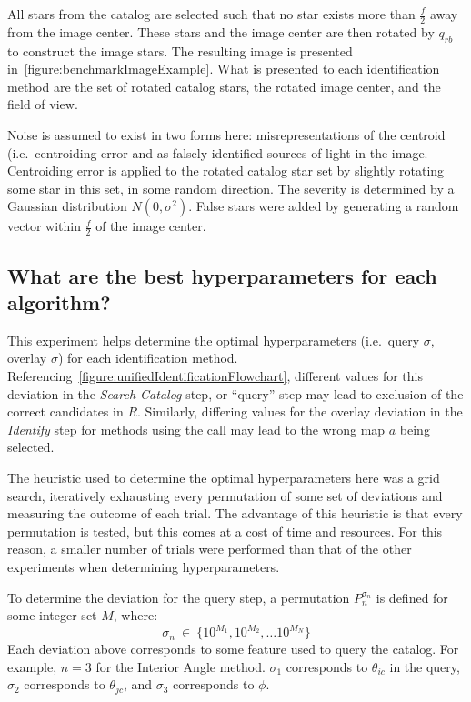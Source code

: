 All stars from the catalog are selected such that no star exists more than $\frac{f}{2}$ away from the image center.
These stars and the image center are then rotated by $q_{rb}$ to construct the image stars.
The resulting image is presented in~\autoref{figure:benchmarkImageExample}.
What is presented to each identification method are the set of rotated catalog stars, the rotated image center, and
the field of view.

Noise is assumed to exist in two forms here: misrepresentations of the centroid (i.e.\ centroiding error and as
falsely identified sources of light in the image.
Centroiding error is applied to the rotated catalog star set by slightly rotating some star in this set, in some
random direction.
The severity is determined by a Gaussian distribution $N(0, \sigma^2)$.
False stars were added by generating a random vector within $\frac{f}{2}$ of the image center.

\subsection{What are the best hyperparameters for each algorithm?}\label{subsec:hyperparameterSelectionMethods}
This experiment helps determine the optimal hyperparameters (i.e.\ query $\sigma$, overlay $\sigma$) for each
identification method.
Referencing~\autoref{figure:unifiedIdentificationFlowchart}, different values for this deviation in the
\textit{Search Catalog} step, or ``query'' step may lead to exclusion of the correct candidates in $R$.
Similarly, differing values for the overlay deviation in the \textit{Identify} step for methods using the
 call may lead to the wrong map $a$ being selected.

The heuristic used to determine the optimal hyperparameters here was a grid search, iteratively exhausting every
permutation of some set of deviations and measuring the outcome of each trial.
The advantage of this heuristic is that every permutation is tested, but this comes at a cost of time and resources.
For this reason, a smaller number of trials were performed than that of the other experiments when determining
hyperparameters.

To determine the deviation for the query step, a permutation $P_n^{\sigma_n}$ is defined for some integer set $M$,
where:
\begin{equation}
    \label{eq:gridSearchQuery}
    \sigma_n \ \in \ \{ 10^{M_1}, 10^{M_2}, \ldots 10^{M_N} \}
\end{equation}
Each deviation above corresponds to some feature used to query the catalog.
For example, $n = 3$ for the Interior Angle method.
$\sigma_1$ corresponds to $\theta_{ic}$ in the query, $\sigma_2$ corresponds to $\theta_{jc}$, and $\sigma_3$
corresponds to $\phi$.

